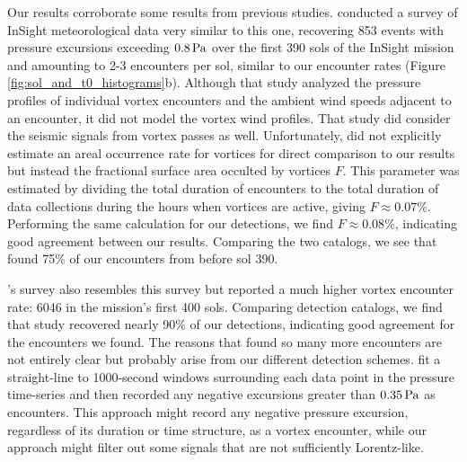 \documentclass[linenumbers,trackchanges]{aastex63}
\begin{document}
Our results corroborate some results from previous studies. \citet{2021Icar..35514119L} conducted a survey of InSight meteorological data very similar to this one, recovering 853 events with pressure excursions exceeding $0.8\,{\rm Pa}$ over the first 390 sols of the InSight mission and amounting to 2-3 encounters per sol, similar to our encounter rates (Figure \ref{fig:sol_and_t0_histograms}b). Although that study analyzed the pressure profiles of individual vortex encounters and the ambient wind speeds adjacent to an encounter, it did not model the vortex wind profiles. That study did consider the seismic signals from vortex passes as well. Unfortunately, \citet{2021Icar..35514119L} did not explicitly estimate an areal occurrence rate for vortices for direct comparison to our results but instead the fractional surface area occulted by vortices $F$. This parameter was estimated by dividing the total duration of encounters to the total duration of data collections during the hours when vortices are active, giving $F \approx 0.07\%$. Performing the same calculation for our detections, we find $F \approx 0.08\%$, indicating good agreement between our results. Comparing the two catalogs, we see that \citet{2021Icar..35514119L} found 75\% of our encounters from before sol 390.


\citet{Spiga2021}'s survey also resembles this survey but reported a much higher vortex encounter rate: 6046 in the mission's first 400 sols. Comparing detection catalogs, we find that study recovered nearly 90\% of our detections, indicating good agreement for the encounters we found. The reasons that \citet{Spiga2021} found so many more encounters are not entirely clear but probably arise from our different detection schemes. \citet{Spiga2021} fit a straight-line to 1000-second windows surrounding each data point in the pressure time-series and then recorded any negative excursions greater than $0.35\,{\rm Pa}$ as encounters. This approach might record any negative pressure excursion, regardless of its duration or time structure, as a vortex encounter, while our approach might filter out some signals that are not sufficiently Lorentz-like. 
\end{document}

